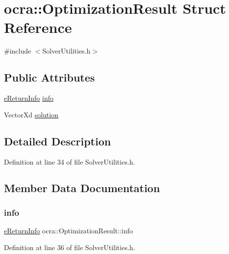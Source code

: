 \hypertarget{structocra_1_1OptimizationResult}{}\section{ocra\+:\+:Optimization\+Result Struct Reference}
\label{structocra_1_1OptimizationResult}


{\ttfamily \#include $<$Solver\+Utilities.\+h$>$}

\subsection*{Public Attributes}
\begin{DoxyCompactItemize}
\item 
\hyperlink{namespaceocra_aa1d873ac30cb0a0f79ba978745de294b}{e\+Return\+Info} \hyperlink{structocra_1_1OptimizationResult_ab422e9cee7b8996585676d61ca14499b}{info}
\item 
Vector\+Xd \hyperlink{structocra_1_1OptimizationResult_a5d0f76e8b3e5d517ba83a2ecd082f85b}{solution}
\end{DoxyCompactItemize}


\subsection{Detailed Description}


Definition at line 34 of file Solver\+Utilities.\+h.



\subsection{Member Data Documentation}
\hypertarget{structocra_1_1OptimizationResult_ab422e9cee7b8996585676d61ca14499b}{}\label{structocra_1_1OptimizationResult_ab422e9cee7b8996585676d61ca14499b} 
\subsubsection{\texorpdfstring{info}{info}}
{\footnotesize\ttfamily \hyperlink{namespaceocra_aa1d873ac30cb0a0f79ba978745de294b}{e\+Return\+Info} ocra\+::\+Optimization\+Result\+::info}



Definition at line 36 of file Solver\+Utilities.\+h.


